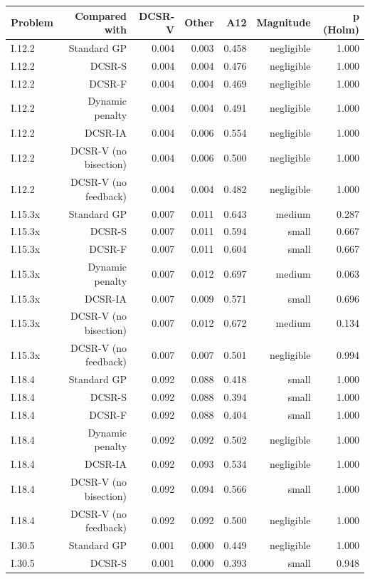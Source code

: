 \begin{tabular}{lrrrrrr}
\toprule
Problem & Compared with & DCSR-V & Other & A12 & Magnitude & p (Holm) \\
\midrule
I.12.2 & Standard GP & 0.004 & 0.003 & 0.458 & negligible & 1.000 \\
I.12.2 & DCSR-S & 0.004 & 0.004 & 0.476 & negligible & 1.000 \\
I.12.2 & DCSR-F & 0.004 & 0.004 & 0.469 & negligible & 1.000 \\
I.12.2 & Dynamic penalty & 0.004 & 0.004 & 0.491 & negligible & 1.000 \\
I.12.2 & DCSR-IA & 0.004 & 0.006 & 0.554 & negligible & 1.000 \\
I.12.2 & DCSR-V (no bisection) & 0.004 & 0.006 & 0.500 & negligible & 1.000 \\
I.12.2 & DCSR-V (no feedback) & 0.004 & 0.004 & 0.482 & negligible & 1.000 \\
I.15.3x & Standard GP & 0.007 & 0.011 & 0.643 & medium & 0.287 \\
I.15.3x & DCSR-S & 0.007 & 0.011 & 0.594 & small & 0.667 \\
I.15.3x & DCSR-F & 0.007 & 0.011 & 0.604 & small & 0.667 \\
I.15.3x & Dynamic penalty & 0.007 & 0.012 & 0.697 & medium & 0.063 \\
I.15.3x & DCSR-IA & 0.007 & 0.009 & 0.571 & small & 0.696 \\
I.15.3x & DCSR-V (no bisection) & 0.007 & 0.012 & 0.672 & medium & 0.134 \\
I.15.3x & DCSR-V (no feedback) & 0.007 & 0.007 & 0.501 & negligible & 0.994 \\
I.18.4 & Standard GP & 0.092 & 0.088 & 0.418 & small & 1.000 \\
I.18.4 & DCSR-S & 0.092 & 0.088 & 0.394 & small & 1.000 \\
I.18.4 & DCSR-F & 0.092 & 0.088 & 0.404 & small & 1.000 \\
I.18.4 & Dynamic penalty & 0.092 & 0.092 & 0.502 & negligible & 1.000 \\
I.18.4 & DCSR-IA & 0.092 & 0.093 & 0.534 & negligible & 1.000 \\
I.18.4 & DCSR-V (no bisection) & 0.092 & 0.094 & 0.566 & small & 1.000 \\
I.18.4 & DCSR-V (no feedback) & 0.092 & 0.092 & 0.500 & negligible & 1.000 \\
I.30.5 & Standard GP & 0.001 & 0.000 & 0.449 & negligible & 1.000 \\
I.30.5 & DCSR-S & 0.001 & 0.000 & 0.393 & small & 0.948 \\

\end{tabular}
